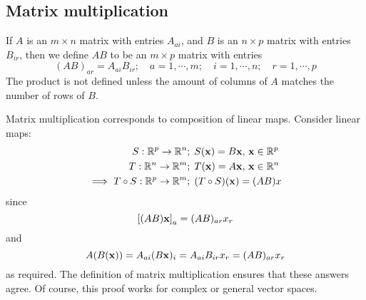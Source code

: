 \subsection{Matrix multiplication}
If \(A\) is an \(m\times n\) matrix with entries \(A_{ai}\), and \(B\) is an \(n \times p\) matrix with entries \(B_{ir}\), then we define \(AB\) to be an \(m \times p\) matrix with entries
\[
	(AB)_{ar} = A_{ai}B_{ir};\quad a = 1, \cdots, m;\quad i = 1, \cdots, n;\quad r = 1, \cdots, p
\]
The product is not defined unless the amount of columns of \(A\) matches the number of rows of \(B\).

Matrix multiplication corresponds to composition of linear maps.
Consider linear maps:
\begin{align*}
	S: \mathbb R^p \to \mathbb R^n                  & ;\; S(\vb x) = B \vb x,\, \vb x \in \mathbb R^p \\
	T: \mathbb R^n \to \mathbb R^m                  & ;\; T(\vb x) = A \vb x,\, \vb x \in \mathbb R^n \\
	\implies T \circ S: \mathbb R^p \to \mathbb R^m & ;\; (T\circ S)(\vb x) = (AB)x
\end{align*}
since
\[
	\left[ (AB)\vb x \right]_a = (AB)_{ar}x_r
\]
and
\[
	A(B(\vb x)) = A_{ai} (B\vb x)_i = A_{ai} B_{ir} x_r = (AB)_{ar}x_r
\]
as required.
The definition of matrix multiplication ensures that these answers agree.
Of course, this proof works for complex or general vector spaces.

